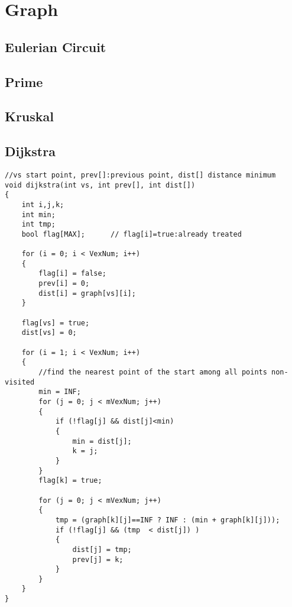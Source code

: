 \newpage
\section{Graph}

\subsection{Eulerian Circuit}


\subsection{Prime}


\subsection{Kruskal}



\subsection{Dijkstra}
\begin{lstlisting}
//vs start point, prev[]:previous point, dist[] distance minimum
void dijkstra(int vs, int prev[], int dist[])
{
    int i,j,k;
    int min;
    int tmp;
    bool flag[MAX];      // flag[i]=true:already treated

    for (i = 0; i < VexNum; i++)
    {
        flag[i] = false;            
        prev[i] = 0;         
        dist[i] = graph[vs][i];
    }

    flag[vs] = true;
    dist[vs] = 0;

    for (i = 1; i < VexNum; i++)
    {
        //find the nearest point of the start among all points non-visited
        min = INF;
        for (j = 0; j < mVexNum; j++)
        {
            if (!flag[j] && dist[j]<min)
            {
                min = dist[j];
                k = j;
            }
        }
        flag[k] = true;

        for (j = 0; j < mVexNum; j++)
        {
            tmp = (graph[k][j]==INF ? INF : (min + graph[k][j]));
            if (!flag[j] && (tmp  < dist[j]) )
            {
                dist[j] = tmp;
                prev[j] = k;
            }
        }
    }
}
\end{lstlisting}

